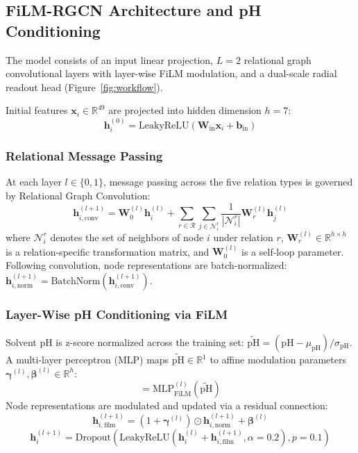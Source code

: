 \documentclass[journal=jcisd8,manuscript=article]{achemso}
\begin{document}
\subsection{FiLM-RGCN Architecture and pH Conditioning}
The model consists of an input linear projection, $L=2$ relational graph convolutional layers with layer-wise FiLM modulation, and a dual-scale radial readout head (Figure~\ref{fig:workflow}).

Initial features $\mathbf{x}_i \in \mathbb{R}^{49}$ are projected into hidden dimension $h=7$:
\begin{equation}
\mathbf{h}_i^{(0)} = \text{LeakyReLU}\left(\mathbf{W}_{\text{in}} \mathbf{x}_i + \mathbf{b}_{\text{in}}\right)
\end{equation}

\subsubsection{Relational Message Passing}
At each layer $l \in \{0, 1\}$, message passing across the five relation types is governed by Relational Graph Convolution:\cite{schlichtkrull2018modeling}
\begin{equation}
\mathbf{h}_{i,\text{conv}}^{(l+1)} = \mathbf{W}_0^{(l)} \mathbf{h}_i^{(l)} + \sum_{r \in \mathcal{R}} \sum_{j \in \mathcal{N}_i^r} \frac{1}{|\mathcal{N}_i^r|} \mathbf{W}_r^{(l)} \mathbf{h}_j^{(l)}
\end{equation}
where $\mathcal{N}_i^r$ denotes the set of neighbors of node $i$ under relation $r$, $\mathbf{W}_r^{(l)} \in \mathbb{R}^{h \times h}$ is a relation-specific transformation matrix, and $\mathbf{W}_0^{(l)}$ is a self-loop parameter. Following convolution, node representations are batch-normalized: $\mathbf{h}_{i,\text{norm}}^{(l+1)} = \text{BatchNorm}(\mathbf{h}_{i,\text{conv}}^{(l+1)})$.

\subsubsection{Layer-Wise pH Conditioning via FiLM}
Solvent pH is z-score normalized across the training set: $\widetilde{\text{pH}} = (\text{pH} - \mu_{\text{pH}}) / \sigma_{\text{pH}}$. A multi-layer perceptron (MLP) maps $\widetilde{\text{pH}} \in \mathbb{R}^1$ to affine modulation parameters $\boldsymbol{\gamma}^{(l)}, \boldsymbol{\beta}^{(l)} \in \mathbb{R}^h$:
\begin{equation}
[\boldsymbol{\gamma}^{(l)}, \boldsymbol{\beta}^{(l)}] = \text{MLP}_{\text{FiLM}}^{(l)}\left(\widetilde{\text{pH}}\right)
\end{equation}
Node representations are modulated and updated via a residual connection:
\begin{equation}
\mathbf{h}_{i,\text{film}}^{(l+1)} = \left(1 + \boldsymbol{\gamma}^{(l)}\right) \odot \mathbf{h}_{i,\text{norm}}^{(l+1)} + \boldsymbol{\beta}^{(l)}
\end{equation}
\begin{equation}
\mathbf{h}_i^{(l+1)} = \text{Dropout}\left(\text{LeakyReLU}\left(\mathbf{h}_i^{(l)} + \mathbf{h}_{i,\text{film}}^{(l+1)}, \alpha=0.2\right), p=0.1\right)
\end{equation}
\end{document}
